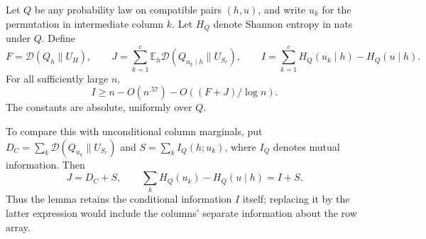 \begin{lemma}
\label{lem:conditional-column-entropy}
Let $Q$ be any probability law on compatible pairs $(h,u)$, and write
$u_k$ for the permutation in intermediate column $k$. Let $H_Q$ denote
Shannon entropy in nats under $Q$. Define
\[
 F=\mathcal D(Q_h\|U_H),\qquad
 J=\sum_{k=1}^c\mathbb E_h\mathcal D(Q_{u_k\mid h}\|U_{S_r}),\qquad
 I=\sum_{k=1}^cH_Q(u_k\mid h)-H_Q(u\mid h).
\]
For all sufficiently large $n$,
\begin{equation}
 I\ge n-O(n^{.57})-O((F+J)/\log n).
 \label{tra:conditional:eq4}
\end{equation}
The constants are absolute, uniformly over $Q$.
\end{lemma}
To compare this with unconditional column marginals, put
$D_C=\sum_k\mathcal D(Q_{u_k}\|U_{S_r})$ and
$S=\sum_k I_Q(h;u_k)$, where $I_Q$ denotes mutual information. Then
\[
 J=D_C+S,\qquad
 \sum_kH_Q(u_k)-H_Q(u\mid h)=I+S.
\]
Thus the lemma retains the conditional information $I$ itself;
replacing it by the latter expression would include the columns'
separate information about the row array.
